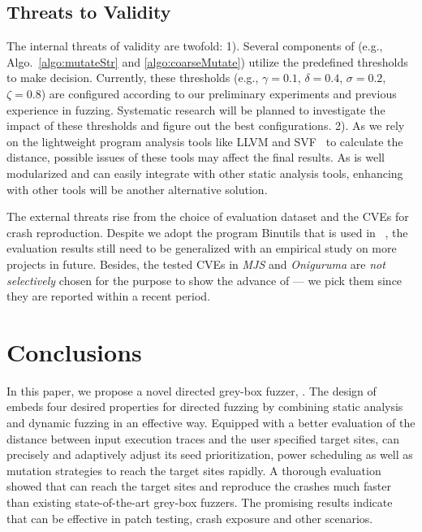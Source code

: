 \vspace{-2mm}  




\subsection{Threats to Validity}

The internal threats of validity are twofold:  1).  Several components of \dFOT (e.g., Algo.~\ref{algo:mutateStr} and \ref{algo:coarseMutate}) utilize  the predefined thresholds to make decision. Currently, these thresholds (e.g., $\gamma=0.1$, $\delta=0.4$, $\sigma=0.2$, $\zeta=0.8$) are configured according to our preliminary experiments and  previous experience in fuzzing. Systematic research will be planned to investigate the impact of these thresholds and figure out the best configurations. 
2). As we rely on the lightweight program analysis tools like LLVM and SVF~\cite{Sui:2016:SVF} to calculate the distance, possible issues of these tools may affect the final results.  As \dFOT is well modularized and can easily integrate with other static analysis tools, enhancing \dFOT with other tools will be another alternative solution. 

The external threats rise from the choice of evaluation dataset and the CVEs for crash reproduction. Despite we adopt the program Binutils that is used in \aflgo~\cite{Bohme:2017:DGF}, the evaluation results still need to be generalized with an empirical study on more projects in future. Besides, the tested CVEs in \emph{MJS} and  \emph{Oniguruma} are \emph{not selectively} chosen for the purpose to show the advance of \dFOT --- we pick them since they are reported within a recent period. 



%
 \section{Conclusions}
In this paper, we propose a novel directed grey-box fuzzer, \dFOT.
The design of \dFOT embeds four desired properties for directed fuzzing by combining static analysis and dynamic fuzzing in an effective way.
Equipped with a better evaluation of the distance between input execution traces and the user specified target sites, \dFOT can precisely and adaptively adjust its seed prioritization, power scheduling as well as mutation strategies to reach the target sites rapidly.
A thorough evaluation showed that \dFOT can reach the target sites and reproduce the crashes much faster than existing state-of-the-art grey-box fuzzers.
The promising results indicate that \dFOT can be effective in patch testing, crash exposure and other scenarios. 